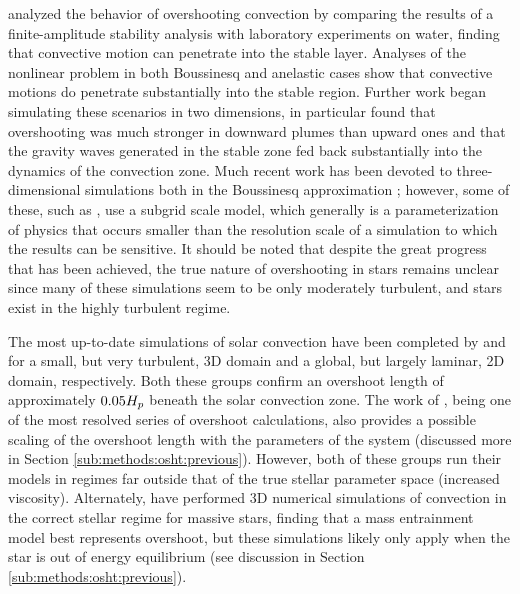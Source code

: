 	\citet{Veronis1963} analyzed the behavior of overshooting convection by comparing the results of a finite-amplitude stability analysis with laboratory experiments on water, finding that convective motion can penetrate into the stable layer.
		Analyses of the nonlinear problem in both Boussinesq \citep[as in][]{Musman1968} and anelastic \citep[as in][]{Latour1981} cases show that convective motions do penetrate substantially into the stable region.
		Further work \citep[e.g.][]{Hurlburt1986,Freytag1996} began simulating these scenarios in two dimensions, \citet{Hurlburt1986} in particular found that overshooting was much stronger in downward plumes than upward ones and that the gravity waves generated in the stable zone fed back substantially into the dynamics of the convection zone.
		Much recent work has been devoted to three-dimensional simulations both in the Boussinesq approximation \citep[e.g.][]{Singh1994,Muthsam1995}; however, some of these, such as \citet{Singh1994}, use a subgrid scale model, which generally is a parameterization of physics that occurs smaller than the resolution scale of a simulation to which the results can be sensitive.
		It should be noted that despite the great progress that has been achieved, the true nature of overshooting in stars remains unclear since many of these simulations seem to be only moderately turbulent, and stars exist in the highly turbulent regime.
	
	The most up-to-date simulations of solar convection have been completed by \citet{Brummell2002} and \citet{Rogers2006} for a small, but very turbulent, 3D domain and a global, but largely laminar, 2D domain, respectively.
		Both these groups confirm an overshoot length of approximately $0.05 H_{p}$ beneath the solar convection zone.
		The work of \citet{Brummell2002}, being one of the most resolved series of overshoot calculations, also provides a possible scaling of the overshoot length with the parameters of the system (discussed more in Section \ref{sub:methods:osht:previous}).
		However, both of these groups run their models in regimes far outside that of the true stellar parameter space (increased viscosity).
		Alternately, \citet{Meakin2007} have performed 3D numerical simulations of convection in the correct stellar regime for massive stars, finding that a mass entrainment model best represents overshoot, but these simulations likely only apply when the star is out of energy equilibrium (see discussion in Section \ref{sub:methods:osht:previous}).
	
